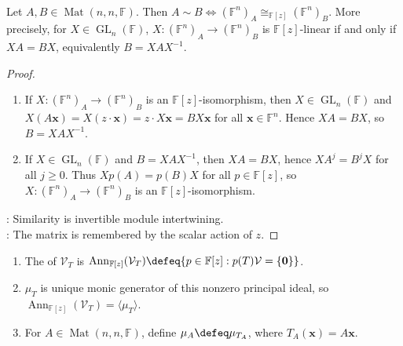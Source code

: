 \begin{corollary} \label{cor:matrix-similarity-iff-matrix-modules-isomorphic} \\
Let $A,B\in\operatorname{Mat}(n,n,\mathbb{F})$. Then $A\sim B\Longleftrightarrow(\mathbb{F}^n)_A\cong_{\mathbb{F}[z]}(\mathbb{F}^n)_B$. More precisely, for $X\in\operatorname{GL}_n(\mathbb{F})$, $X:(\mathbb{F}^n)_A\to(\mathbb{F}^n)_B$ is $\mathbb{F}[z]$-linear if and only if $XA=BX$, equivalently $B=XAX^{-1}$.
\begin{proof}
\begin{enumerate}[label=\roman*.]
\setlength{\itemsep}{0pt}
\item[$(\Rightarrow)$] If $X:(\mathbb{F}^n)_A\to(\mathbb{F}^n)_B$ is an $\mathbb{F}[z]$-isomorphism, then $X\in\operatorname{GL}_n(\mathbb{F})$ and $X(A\mathbf{x})=X(z\cdot\mathbf{x})=z\cdot X\mathbf{x}=BX\mathbf{x}$ for all $\mathbf{x}\in\mathbb{F}^n$. Hence $XA=BX$, so $B=XAX^{-1}$.
\item[$(\Leftarrow)$] If $X\in\operatorname{GL}_n(\mathbb{F})$ and $B=XAX^{-1}$, then $XA=BX$, hence $XA^j=B^jX$ for all $j\geq0$. Thus $Xp(A)=p(B)X$ for all $p\in\mathbb{F}[z]$, so $X:(\mathbb{F}^n)_A\to(\mathbb{F}^n)_B$ is an $\mathbb{F}[z]$-isomorphism.
\end{enumerate}
: Similarity is invertible module intertwining.\\
: The matrix is remembered by the scalar action of $z$.
\end{proof}
\end{corollary}

\begin{definition} \label{def:operator-module-annihilator-minimal-polynomial} 
\begin{enumerate}[label=(\roman*)]
\setlength{\itemsep}{0pt}
\item The  of $\mathcal{V}_T$ is $\operatorname{Ann}_{\mathbb{F}[z]}(\mathcal{V}_T)\defeq\{p\in\mathbb{F}[z]:p(T)\mathcal{V}=\{\mathbf{0}\}\}$.
\item {} $\mu_T$ is unique monic generator of this nonzero principal ideal, so $\operatorname{Ann}_{\mathbb{F}[z]}(\mathcal{V}_T)=\langle\mu_T\rangle$.
\item For $A\in\operatorname{Mat}(n,n,\mathbb{F})$, define $\mu_A\defeq\mu_{T_A}$, where $T_A(\mathbf{x})=A\mathbf{x}$.
\end{enumerate}
\end{definition}

